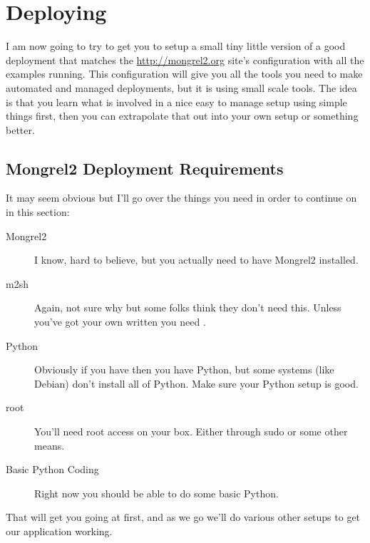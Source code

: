 \chapter{Deploying}

I am now going to try to get you to setup a small tiny little version of a good
deployment that matches the \url{http://mongrel2.org} site's configuration with
all the examples running.  This configuration will give you all the tools you 
need to make automated and managed deployments, but it is using small scale tools.
The idea is that you learn what is involved in a nice easy to manage setup using simple
things first, then you can extrapolate that out into your own setup or something
better.


\section{Mongrel2 Deployment Requirements}

It may seem obvious but I'll go over the things you need in order to continue
on in this section:

\begin{description}
\item [Mongrel2] I know, hard to believe, but you actually need to have Mongrel2 installed.
\item [m2sh] Again, not sure why but some folks think they don't need this.  Unless you've
    got your own written you need .
\item [Python] Obviously if you have  then you have Python, but some systems
    (like Debian) don't install all of Python.  Make sure your Python setup is good.
\item [root] You'll need root access on your box.  Either through sudo or some other means.
\item [Basic Python Coding] Right now you should be able to do some basic Python. 
\end{description}

That will get you going at first, and as we go we'll do various other setups to 
get our application working.

